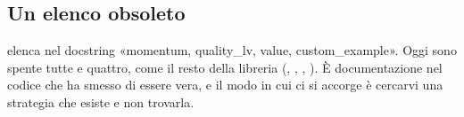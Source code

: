 \subsection{Un elenco obsoleto}

 elenca nel docstring «momentum, quality\_lv,
value, custom\_example». Oggi sono spente tutte e quattro, come il resto
della libreria (, , ,
). È documentazione
nel codice che ha smesso di essere vera, e il modo in cui ci si accorge è
cercarvi una strategia che esiste e non trovarla.

